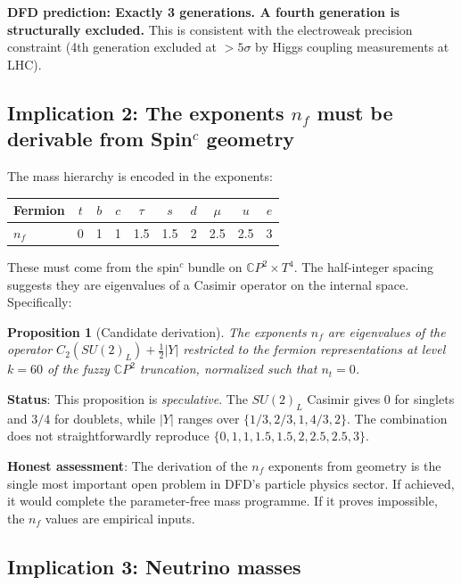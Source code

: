 \documentclass[11pt,a4paper]{article}
\newtheorem{proposition}{Proposition}
\newcommand{\CP}{\mathbb{C}P}
\begin{document}
\textbf{DFD prediction: Exactly 3 generations. A fourth generation is structurally excluded.} This is consistent with the electroweak precision constraint (4th generation excluded at $>5\sigma$ by Higgs coupling measurements at LHC).

\subsection{Implication 2: The exponents $n_f$ must be derivable from Spin$^c$ geometry}

The mass hierarchy is encoded in the exponents:
\begin{center}
\begin{tabular}{lccccccccc}
\toprule
Fermion & $t$ & $b$ & $c$ & $\tau$ & $s$ & $d$ & $\mu$ & $u$ & $e$ \\
\midrule
$n_f$ & 0 & 1 & 1 & 1.5 & 1.5 & 2 & 2.5 & 2.5 & 3 \\
\bottomrule
\end{tabular}
\end{center}

These must come from the spin$^c$ bundle on $\CP^2 \times T^4$. The half-integer spacing suggests they are eigenvalues of a Casimir operator on the internal space. Specifically:

\begin{proposition}[Candidate derivation]
The exponents $n_f$ are eigenvalues of the operator $C_2(SU(2)_L) + \frac{1}{2}|Y|$ restricted to the fermion representations at level $k = 60$ of the fuzzy $\CP^2$ truncation, normalized such that $n_t = 0$.
\end{proposition}

\textbf{Status}: This proposition is \emph{speculative}. The $SU(2)_L$ Casimir gives $0$ for singlets and $3/4$ for doublets, while $|Y|$ ranges over $\{1/3, 2/3, 1, 4/3, 2\}$. The combination does not straightforwardly reproduce $\{0, 1, 1, 1.5, 1.5, 2, 2.5, 2.5, 3\}$.

\textbf{Honest assessment}: The derivation of the $n_f$ exponents from geometry is the single most important open problem in DFD's particle physics sector. If achieved, it would complete the parameter-free mass programme. If it proves impossible, the $n_f$ values are empirical inputs.

\subsection{Implication 3: Neutrino masses}
\end{document}
